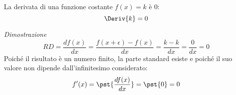 \begin{teorema}
La derivata di una funzione costante \(f(x) = k\) è \(0\):
\[\Deriv{k}=0\]
\end{teorema}
\emph{Dimostrazione}
\[RD = \dfrac{df(x)}{dx} = \dfrac{f(x +\epsilon) -f(x)}{dx} =
  \dfrac{k-k}{dx} = \dfrac{0}{dx} = 0\]
Poiché il risultato è un numero finito, la parte standard esiste e 
poiché il suo valore non dipende dall'infinitesimo considerato:
\[f'(x) = \pst{\dfrac{df(x)}{dx}} = \pst{0} = 0\]
% 

\begin{comment}

\subsection{Derivata della funzione }
\label{subsec:differenziazione_}
Una funzione lineare è :
\[f: x \mapsto mx +q \quad \text{o} \quad   f(x)=mx +q \quad \text{o} \quad 
  y = mx +q.\]
\begin{teorema}
  La derivata di una funzione lineare è 
\end{teorema}
\noindent Ipotesi: \tab Tesi: 
\begin{proof}
\begin{align*}
RD &=\dfrac{df(x)}{dx} =\dfrac{f(x+dx)-f(x)}{dx}=\\
               &=\dfrac{m(x+dx)+q-\tonda{mx+q}}{dx}=
                 \dfrac{mx-mdx+q-mx-q}{dx}=
                 \dfrac{mdx}{dx}=m
\end{align*}
Dato che \(RD\) è un numero finito:
\[f'(x) = \pst{RD}= \pst{m}=m\]

\vspace{-1em} \hspace{20mm} 
poiché il valore della parte standard non dipende da \(dx\).
\end{proof}

\end{comment}

